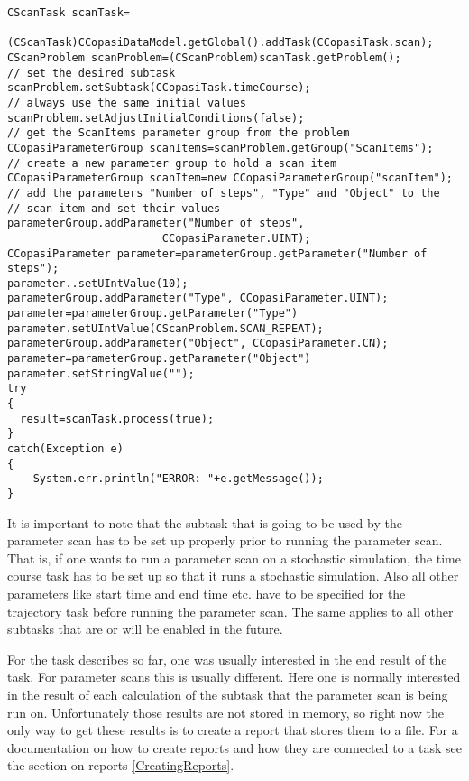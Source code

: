 \documentclass[a4,10pt]{article}
\begin{document}
\begin{lstlisting}
CScanTask scanTask=
      (CScanTask)CCopasiDataModel.getGlobal().addTask(CCopasiTask.scan);
CScanProblem scanProblem=(CScanProblem)scanTask.getProblem();
// set the desired subtask
scanProblem.setSubtask(CCopasiTask.timeCourse);
// always use the same initial values
scanProblem.setAdjustInitialConditions(false);
// get the ScanItems parameter group from the problem
CCopasiParameterGroup scanItems=scanProblem.getGroup("ScanItems");
// create a new parameter group to hold a scan item
CCopasiParameterGroup scanItem=new CCopasiParameterGroup("scanItem");
// add the parameters "Number of steps", "Type" and "Object" to the 
// scan item and set their values
parameterGroup.addParameter("Number of steps",
                        CCopasiParameter.UINT);
CCopasiParameter parameter=parameterGroup.getParameter("Number of steps");
parameter..setUIntValue(10);
parameterGroup.addParameter("Type", CCopasiParameter.UINT);
parameter=parameterGroup.getParameter("Type")
parameter.setUIntValue(CScanProblem.SCAN_REPEAT);
parameterGroup.addParameter("Object", CCopasiParameter.CN);
parameter=parameterGroup.getParameter("Object")
parameter.setStringValue("");
try
{
  result=scanTask.process(true);
}
catch(Exception e)
{
    System.err.println("ERROR: "+e.getMessage());
}

\end{lstlisting}

It is important to note that the subtask that is going to be used by the parameter scan has to be set up properly prior to running the parameter scan. That is, if one wants to run a parameter scan on a stochastic simulation, the time course task has to be set up so that it runs a stochastic simulation. Also all other parameters like start time and end time etc. have to be specified for the trajectory task before running the parameter scan.
The same applies to all other subtasks that are or will be enabled in the future.


For the task describes so far, one was usually interested in the end result of the task. For parameter scans this is usually different. Here one is normally interested in the result of each calculation of the subtask that the parameter scan is being run on.
Unfortunately those results are not stored in memory, so right now the only way to get these results is to create a report that stores them to a file. For a documentation on how to create reports and how they are connected to a task see the section on reports \ref{CreatingReports}.
\end{document}
